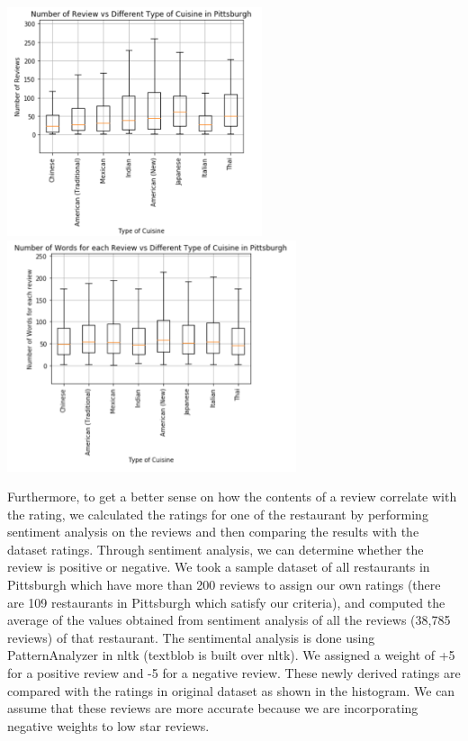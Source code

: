\documentclass{neu_handout}
\begin{document}
\begin{center}
	\includegraphics[width=75mm,scale=0.3]{number_of_review_vs_cuisine}
	\includegraphics[width=85mm,scale=0.3]{average_review_length}
\end{center}

Furthermore, to get a better sense on how the contents of a review correlate with the rating, we calculated the ratings for one of the restaurant by performing sentiment analysis on the reviews and then comparing the results with the dataset ratings. Through sentiment analysis, we can determine whether the review is positive or negative. We took a sample dataset of all restaurants in Pittsburgh which have more than 200 reviews to assign our own ratings (there are 109 restaurants in Pittsburgh which satisfy our criteria), and computed the average of the values obtained from sentiment analysis of all the reviews (38,785 reviews) of that restaurant. The sentimental analysis is done using PatternAnalyzer in nltk (textblob is built over nltk). We assigned a weight of +5 for a positive review and -5 for a negative review. These newly derived ratings are compared with the ratings in original dataset as shown in the histogram. We can assume that these reviews are more accurate because we are incorporating negative weights to low star reviews.
\end{document}
